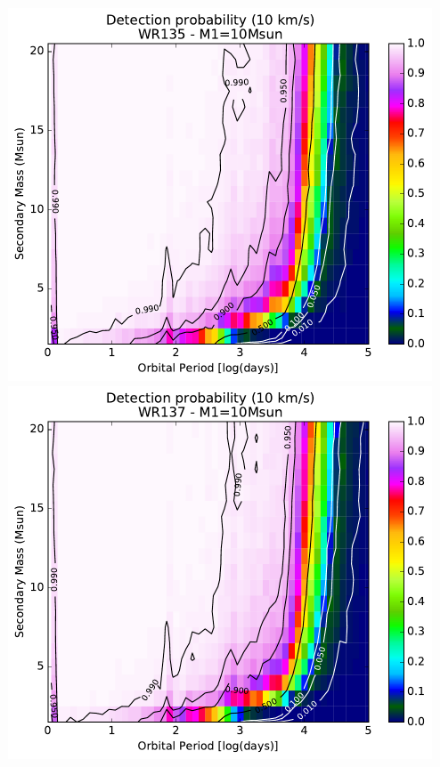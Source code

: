 \newpage
\begin{figure}[h!]
    \centering
    \begin{minipage}{0.49\textwidth}
    \centering
    \includegraphics[width=\textwidth]{chapters/appendix3/image/135PM2_thres10_MAR31.pdf}
    \end{minipage}\hfill
    \begin{minipage}{0.49\textwidth}
    \centering
    \includegraphics[width=\textwidth]{chapters/appendix3/image/137PM2_thres10_MAR31.pdf}

\end{minipage}
\end{figure}
